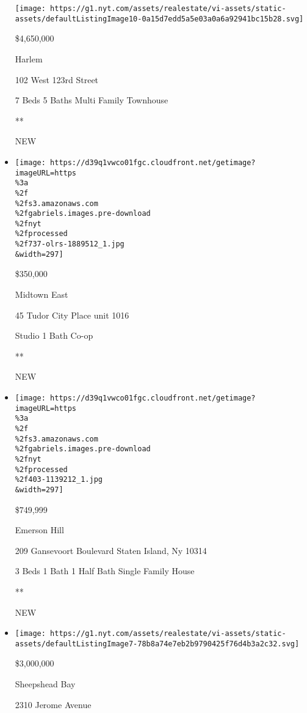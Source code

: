\begin{itemize}
  \texttt{[image: https://g1.nyt.com/assets/realestate/vi-assets/static-assets/defaultListingImage10-0a15d7edd5a5e03a0a6a92941bc15b28.svg]}

  \$4,650,000

  Harlem

  102 West 123rd Street

  7 Beds \textbar{} 5 Baths \textbar{} Multi Family Townhouse

  **

  NEW
\item
  \href{/real-estate/usa/ny/new-york/midtown-east/homes-for-sale/45-tudor-city-place/737-OLRS-1889512?}{}

  \texttt{[image: https://d39q1vwco01fgc.cloudfront.net/getimage?imageURL=https\\\%3a\\\%2f\\\%2fs3.amazonaws.com\\\%2fgabriels.images.pre-download\\\%2fnyt\\\%2fprocessed\\\%2f737-olrs-1889512\_1.jpg\\\&width=297]}

  \$350,000

  Midtown East

  45 Tudor City Place unit 1016

  Studio \textbar{} 1 Bath \textbar{} Co-op

  **

  NEW
\item
  \href{/real-estate/usa/ny/staten-island/emerson-hill/homes-for-sale/209-gansevoort-boulevard-staten-island-ny-10314/403-1139212?}{}

  \texttt{[image: https://d39q1vwco01fgc.cloudfront.net/getimage?imageURL=https\\\%3a\\\%2f\\\%2fs3.amazonaws.com\\\%2fgabriels.images.pre-download\\\%2fnyt\\\%2fprocessed\\\%2f403-1139212\_1.jpg\\\&width=297]}

  \$749,999

  Emerson Hill

  209 Gansevoort Boulevard Staten Island, Ny 10314

  3 Beds \textbar{} 1 Bath \textbar{} 1 Half Bath \textbar{} Single
  Family House

  **

  NEW
\item
  \href{/real-estate/usa/ny/brooklyn/sheepshead-bay/homes-for-sale/2310-jerome-avenue/13063-5538020?}{}

  \texttt{[image: https://g1.nyt.com/assets/realestate/vi-assets/static-assets/defaultListingImage7-78b8a74e7eb2b9790425f76d4b3a2c32.svg]}

  \$3,000,000

  Sheepshead Bay

  2310 Jerome Avenue


\end{itemize}
